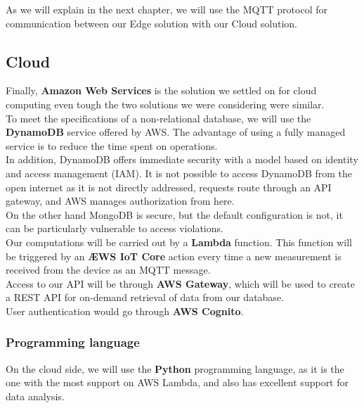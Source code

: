 As we will explain in the next chapter, we will use the MQTT protocol for communication
between our Edge solution with our Cloud solution.

\subsection{Cloud}
Finally, \textbf{Amazon Web Services} is the solution we settled on for cloud computing
even tough the two solutions we were considering were similar. \\

To meet the specifications of a non-relational database, we will use the \textbf{DynamoDB}
service offered by AWS. The advantage of using a fully managed service is to reduce
the time spent on operations. \\
In addition, DynamoDB offers immediate security with a model based on identity and
access management (IAM). It is not possible to access DynamoDB from the open internet
as it is not directly addressed, requests route through an API gateway, and AWS manages
authorization from here. \\
On the other hand MongoDB is secure, but the default configuration is not, it can
be particularly vulnerable to access violations. \\

Our computations will be carried out by a \textbf{Lambda} function. This function
will be triggered by an \textbf{ÆWS IoT Core} action every time a new measurement
is received from the device as an MQTT message. \\

Access to our API will be through \textbf{AWS Gateway}, which will be used to create
a REST API for on-demand retrieval of data from our database. \\

User authentication would go through \textbf{AWS Cognito}.

\subsubsection*{Programming language}
On the cloud side, we will use the \textbf{Python} programming language, as it is
the one with the most support on AWS Lambda, and also has excellent support for
data analysis. \\